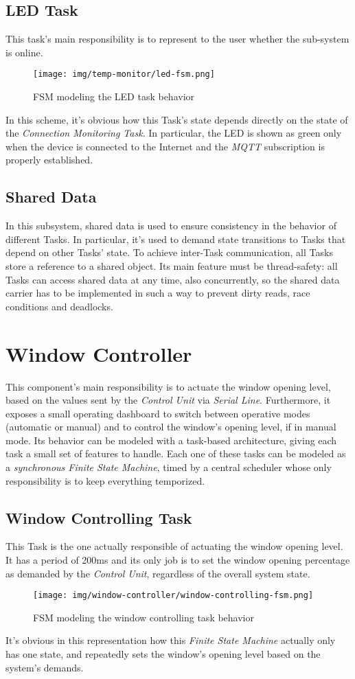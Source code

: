 \documentclass[a4paper,12pt]{report}
\begin{document}
		\subsection{LED Task}
		This task's main responsibility is to represent to the user whether the sub-system is online.
		\begin{figure}[H]
			\centering{}
			\texttt{[image: img/temp-monitor/led-fsm.png]}
			\caption{FSM modeling the LED task behavior}
			\label{img:temp-monitor/led-fsm}
		\end{figure}
		In this scheme, it's obvious how this Task's state depends directly on the state of the \textit{Connection Monitoring Task}. In particular, the LED is shown as green only when the device is connected to the Internet and the \textit{MQTT} subscription is properly established.
		\subsection{Shared Data}
		In this subsystem, shared data is used to ensure consistency in the behavior of different Tasks. In particular, it's used to demand state transitions to Tasks that depend on other Tasks' state.
		\newline To achieve inter-Task communication, all Tasks store a reference to a shared object. Its main feature must be thread-safety: all Tasks can access shared data at any time, also concurrently, so the shared data carrier has to be implemented in such a way to prevent dirty reads, race conditions and deadlocks.
	\section{Window Controller}
	This component's main responsibility is to actuate the window opening level, based on the values sent by the \textit{Control Unit} via \textit{Serial Line}. Furthermore, it exposes a small operating dashboard to switch between operative modes (automatic or manual) and to control the window's opening level, if in manual mode. Its behavior can be modeled with a task-based architecture, giving each task a small set of features to handle. Each one of these tasks can be modeled as a \textit{synchronous Finite State Machine}, timed by a central scheduler whose only responsibility is to keep everything temporized.
		\subsection{Window Controlling Task}
		This Task is the one actually responsible of actuating the window opening level. It has a period of 200ms and its only job is to set the window opening percentage as demanded by the \textit{Control Unit}, regardless of the overall system state.
		\begin{figure}[H]
			\centering{}
			\texttt{[image: img/window-controller/window-controlling-fsm.png]}
			\caption{FSM modeling the window controlling task behavior}
			\label{img:window-controller/window-controlling-fsm}
		\end{figure}
		It's obvious in this representation how this \textit{Finite State Machine} actually only has one state, and repeatedly sets the window's opening level based on the system's demands.
\end{document}
